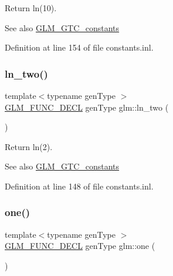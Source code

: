 Return ln(10). \begin{DoxySeeAlso}{See also}
\hyperlink{group__gtc__constants}{G\+L\+M\+\_\+\+G\+T\+C\+\_\+constants} 
\end{DoxySeeAlso}


Definition at line 154 of file constants.\+inl.

\mbox{\label{group__gtc__constants_ga22fae798430edc3022766af4fd83e8a4}} 
\subsubsection{\texorpdfstring{ln\+\_\+two()}{ln\_two()}}
{\footnotesize\ttfamily template$<$typename gen\+Type $>$ \\
\hyperlink{setup_8hpp_ab2d052de21a70539923e9bcbf6e83a51}{G\+L\+M\+\_\+\+F\+U\+N\+C\+\_\+\+D\+E\+CL} gen\+Type glm\+::ln\+\_\+two (\begin{DoxyParamCaption}{ }\end{DoxyParamCaption})}

Return ln(2). \begin{DoxySeeAlso}{See also}
\hyperlink{group__gtc__constants}{G\+L\+M\+\_\+\+G\+T\+C\+\_\+constants} 
\end{DoxySeeAlso}


Definition at line 148 of file constants.\+inl.

\mbox{\label{group__gtc__constants_ga8186ec2c330457d41d9686c47cd3b2d1}} 
\subsubsection{\texorpdfstring{one()}{one()}}
{\footnotesize\ttfamily template$<$typename gen\+Type $>$ \\
\hyperlink{setup_8hpp_ab2d052de21a70539923e9bcbf6e83a51}{G\+L\+M\+\_\+\+F\+U\+N\+C\+\_\+\+D\+E\+CL} gen\+Type glm\+::one (\begin{DoxyParamCaption}{ }\end{DoxyParamCaption})}

